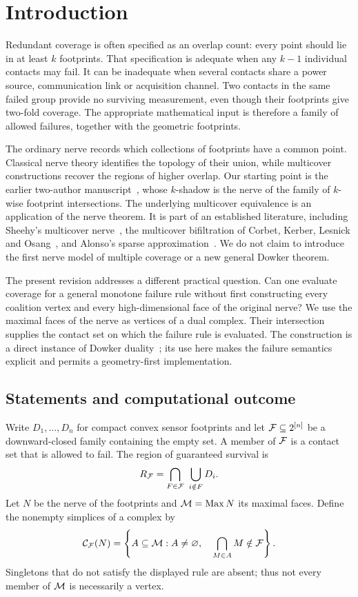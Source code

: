 \section{Introduction}
\label{sec:intro}
Redundant coverage is often specified as an overlap count: every point should lie in at least $k$ footprints. That specification is adequate when any $k-1$ individual contacts may fail. It can be inadequate when several contacts share a power source, communication link or acquisition channel. Two contacts in the same failed group provide no surviving measurement, even though their footprints give two-fold coverage. The appropriate mathematical input is therefore a family of allowed failures, together with the geometric footprints.

The ordinary nerve records which collections of footprints have a common point. Classical nerve theory identifies the topology of their union, while multicover constructions recover the regions of higher overlap. Our starting point is the earlier two-author manuscript~\cite{original}, whose $k$-shadow is the nerve of the family of $k$-wise footprint intersections. The underlying multicover equivalence is an application of the nerve theorem. It is part of an established literature, including Sheehy's multicover nerve~\cite{sheehy}, the multicover bifiltration of Corbet, Kerber, Lesnick and Osang~\cite{corbet}, and Alonso's sparse approximation~\cite{alonso}. We do not claim to introduce the first nerve model of multiple coverage or a new general Dowker theorem.

The present revision addresses a different practical question. Can one evaluate coverage for a general monotone failure rule without first constructing every coalition vertex and every high-dimensional face of the original nerve? We use the maximal faces of the nerve as vertices of a dual complex. Their intersection supplies the contact set on which the failure rule is evaluated. The construction is a direct instance of Dowker duality~\cite{dowker,chowdhury}; its use here makes the failure semantics explicit and permits a geometry-first implementation.

\subsection{Statements and computational outcome}
Write $D_1,\ldots,D_n$ for compact convex sensor footprints and let $\mathcal F\subseteq 2^{[n]}$ be a downward-closed family containing the empty set. A member of $\mathcal F$ is a contact set that is allowed to fail. The region of guaranteed survival is
\begin{equation}\label{eq:survival-intro}
R_{\mathcal F}=\bigcap_{F\in\mathcal F}\ \bigcup_{i\notin F}D_i.
\end{equation}
Let $N$ be the nerve of the footprints and $\mathcal M=\operatorname{Max} N$ its maximal faces. Define the nonempty simplices of a complex by
\begin{equation}\label{eq:dual-intro}
\mathcal C_{\mathcal F}(N)=\left\{A\subseteq\mathcal M:A\ne\varnothing,\quad \bigcap_{M\in A}M\notin\mathcal F\right\}.
\end{equation}
Singletons that do not satisfy the displayed rule are absent; thus not every member of $\mathcal M$ is necessarily a vertex.

